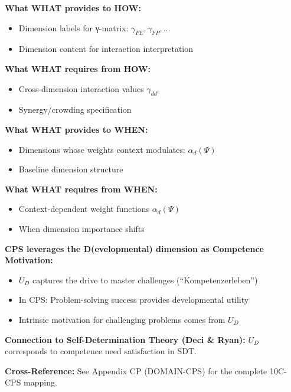 \begin{tcolorbox}[colback=yellow!5!white, colframe=yellow!75!black,
    title=Integration: CORE-WHAT $\leftrightarrow$ CORE-HOW]
\textbf{What WHAT provides to HOW:}
\begin{itemize}[nosep]
\item Dimension labels for γ-matrix: $\gamma_{FE}, \gamma_{FP}, \ldots$
\item Dimension content for interaction interpretation
\end{itemize}

\textbf{What WHAT requires from HOW:}
\begin{itemize}[nosep]
\item Cross-dimension interaction values $\gamma_{dd'}$
\item Synergy/crowding specification
\end{itemize}
\end{tcolorbox}

\begin{tcolorbox}[colback=yellow!5!white, colframe=yellow!75!black,
    title=Integration: CORE-WHAT $\leftrightarrow$ CORE-WHEN]
\textbf{What WHAT provides to WHEN:}
\begin{itemize}[nosep]
\item Dimensions whose weights context modulates: $\alpha_d(\Psi)$
\item Baseline dimension structure
\end{itemize}

\textbf{What WHAT requires from WHEN:}
\begin{itemize}[nosep]
\item Context-dependent weight functions $\alpha_d(\Psi)$
\item When dimension importance shifts
\end{itemize}
\end{tcolorbox}

\begin{tcolorbox}[colback=green!5!white, colframe=green!75!black,
    title=Application Domain: Complex Problem Solving (CP)]
\textbf{CPS leverages the D(evelopmental) dimension as Competence Motivation:}
\begin{itemize}[nosep]
\item $U_D$ captures the drive to master challenges (``Kompetenzerleben'')
\item In CPS: Problem-solving success provides developmental utility
\item Intrinsic motivation for challenging problems comes from $U_D$
\end{itemize}

\textbf{Connection to Self-Determination Theory (Deci \& Ryan):}
$U_D$ corresponds to competence need satisfaction in SDT.

\textbf{Cross-Reference:} See Appendix CP (DOMAIN-CPS) for the complete 10C-CPS mapping.
\end{tcolorbox}


